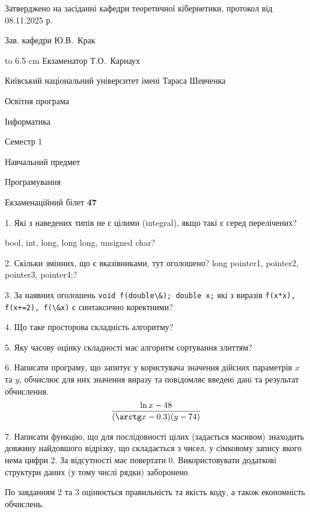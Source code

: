 \documentclass[12pt, ukrainian]{article}
\def\code#1{\Verb!#1!}
\begin{document}
{\smallskip\smallskip \begin {scriptsize} Затверджено на засіданні кафедри теоретичної кібернетики, протокол   від   08.11.2025 р.\par\smallskip\smallskip\smallskip\smallskip
{\parbox {6.5 cm} {Зав. кафедри \dotfill Ю.В.~Крак}}\hspace {0.7cm} {\hbox to 6.5 cm { Екзаменатор \dotfill Т.О.~Карнаух}} \end{scriptsize}}
\newpage
{{\begin {scriptsize}\par
{ \center  Київський національний університет імені Тараса Шевченка \par}
{\parbox {5 cm}{Освітня програма \hfill}{\parbox {7 cm}{Інформатика\hfill}}\parbox {6 cm}{\hfill Семестр 1}}\par
{\parbox {5 cm} {Навчальний предмет \hfill}\parbox {7 cm}{Програмування \hfill}\parbox {6cm}{\hfill}\par}\vspace{-15pt} \end{scriptsize}}{\center Екзаменаційний білет \No \textbf { 47 }\par}}
{%
1. Які з наведених типів не є цілими (integral), якщо такі є серед перелічених?

bool, int, long, long long, unsigned char?
\par
\vspace{2mm}
2. Скільки змінних, що є вказівниками, тут оголошено?
long pointer1, pointer2, pointer3, pointer4;?
\par
\vspace{2mm}
3. За наявних оголошень \code{void f(double\&); double x;} які з виразів \code{f(x*x), f(x+=2), f(\&x)} є синтаксично коректними?
\par
\vspace{2mm}
4. Що таке просторова складність алгоритму?
\par
\vspace{2mm}
5. Яку часову оцінку складності має алгоритм сортування злиттям?
\par
\vspace{2mm}
6. Написати програму, що запитує у користувача значення дійсних параметрів $x$ та $y$, обчислює для них значення виразу та повiдомляє введенi данi та результат обчислення.
$$\frac{\ln x - 48}{(\arctg x - 0.3) (y - 74)}$$ 

\par
7. Написати функцію, що для послідовності цілих (задається масивом) знаходить довжину найдовшого відрізку, що складається з чисел, у сімковому запису якого нема цифри 2. За відсутності має повертати $0$. Використовувати додаткові структури даних (у тому числі рядки) заборонено.

По завданням 2 та 3 оцінюється правильність та якість коду, а також економність обчислень.

}
\end{document}
